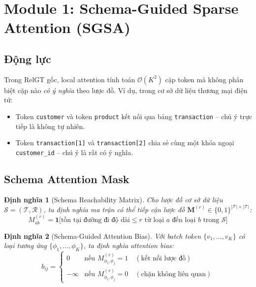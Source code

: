 \documentclass[12pt,a4paper]{article}
\newtheorem{definition}{Định nghĩa}[section]
\begin{document}
\section{Module 1: Schema-Guided Sparse Attention (SGSA)}

\subsection{Động lực}

Trong RelGT gốc, local attention tính toán $\mathcal{O}(K^2)$ cặp token mà
không phân biệt cặp nào \emph{có ý nghĩa} theo lược đồ. Ví dụ, trong cơ sở
dữ liệu thương mại điện tử:
\begin{itemize}[nosep]
  \item Token \texttt{customer} và token \texttt{product} kết nối qua bảng
        \texttt{transaction} -- chú ý trực tiếp là không tự nhiên.
  \item Token \texttt{transaction[1]} và \texttt{transaction[2]} chia sẻ cùng
        một khóa ngoại \texttt{customer\_id} -- chú ý là rất có ý nghĩa.
\end{itemize}

\subsection{Schema Attention Mask}

\begin{definition}[Schema Reachability Matrix]
Cho lược đồ cơ sở dữ liệu $\mathcal{S} = (\mathcal{T}, \mathcal{R})$, ta định
nghĩa ma trận có thể tiếp cận lược đồ $\mathbf{M}^{(r)} \in \{0,1\}^{|\mathcal{T}|\times|\mathcal{T}|}$:
\[
  M^{(r)}_{ab} = \mathbf{1}\bigl[\text{tồn tại đường đi độ dài} \le r
    \text{ từ loại } a \text{ đến loại } b \text{ trong } \mathcal{S}\bigr]
\]
\end{definition}

\begin{definition}[Schema-Guided Attention Bias]
Với batch token $\{v_1,\ldots,v_K\}$ có loại tương ứng $\{\phi_1,\ldots,\phi_K\}$,
ta định nghĩa attention bias:
\begin{equation}
  b_{ij} = \begin{cases}
    0 & \text{nếu } M^{(r)}_{\phi_i, \phi_j} = 1 \quad (\text{kết nối lược đồ}) \\
    -\infty & \text{nếu } M^{(r)}_{\phi_i, \phi_j} = 0 \quad (\text{chặn không liên quan})
  \end{cases}
  \label{eq:schema_bias}
\end{equation}
\end{definition}
\end{document}
